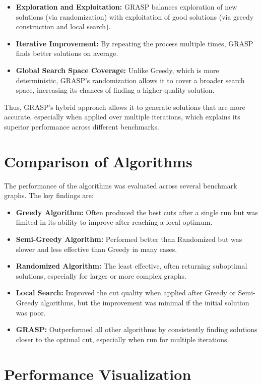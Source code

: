 \documentclass[a4paper,12pt]{article}
\begin{document}
\begin{itemize}
    \item \textbf{Exploration and Exploitation:} GRASP balances exploration of new solutions (via randomization) with exploitation of good solutions (via greedy construction and local search).
    \item \textbf{Iterative Improvement:} By repeating the process multiple times, GRASP finds better solutions on average.
    \item \textbf{Global Search Space Coverage:} Unlike Greedy, which is more deterministic, GRASP's randomization allows it to cover a broader search space, increasing its chances of finding a higher-quality solution.
\end{itemize}

Thus, GRASP’s hybrid approach allows it to generate solutions that are more accurate, especially when applied over multiple iterations, which explains its superior performance across different benchmarks.

\section*{Comparison of Algorithms}

The performance of the algorithms was evaluated across several benchmark graphs. The key findings are:

\begin{itemize}
    \item \textbf{Greedy Algorithm:} Often produced the best cuts after a single run but was limited in its ability to improve after reaching a local optimum.
    \item \textbf{Semi-Greedy Algorithm:} Performed better than Randomized but was slower and less effective than Greedy in many cases.
    \item \textbf{Randomized Algorithm:} The least effective, often returning suboptimal solutions, especially for larger or more complex graphs.
    \item \textbf{Local Search:} Improved the cut quality when applied after Greedy or Semi-Greedy algorithms, but the improvement was minimal if the initial solution was poor.
    \item \textbf{GRASP:} Outperformed all other algorithms by consistently finding solutions closer to the optimal cut, especially when run for multiple iterations.
\end{itemize}

\section*{Performance Visualization}
\end{document}
